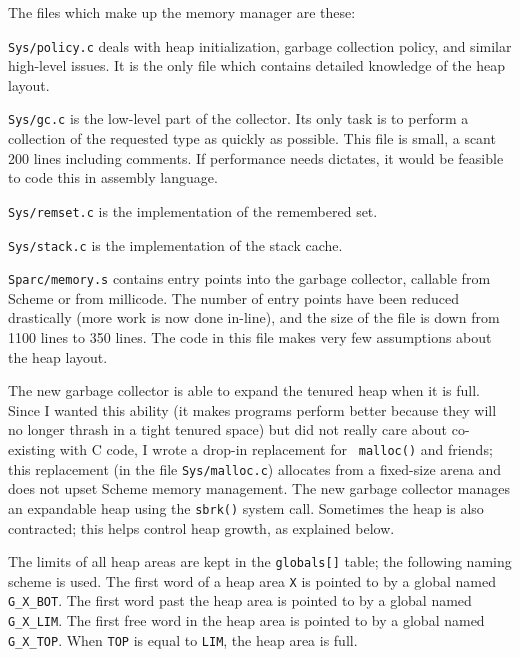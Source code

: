 The files which make up the memory manager are these:

\begin{description}

\item{{\tt Sys/policy.c}} deals with heap initialization, garbage collection 
policy, and similar high-level issues. It is the only file which contains
detailed knowledge of the heap layout.

\item{{\tt Sys/gc.c}} is the low-level part of the collector. Its only task 
is to perform a collection of the requested type as quickly as possible.
This file is small, a scant 200 lines including comments. If performance
needs dictates, it would be feasible to code this in assembly language.

\item{{\tt Sys/remset.c}} is the implementation of the remembered set.

\item{{\tt Sys/stack.c}} is the implementation of the stack cache.

\item{{\tt Sparc/memory.s}} contains entry points into the garbage collector, 
callable from Scheme or from millicode. The number of entry points have been
reduced drastically (more work is now done in-line), and the size of the
file is down from 1100 lines to 350 lines. The code in this file makes 
very few assumptions about the heap layout.

\end{description}

The new garbage collector is able to expand the tenured heap when it is
full. Since I wanted this ability (it makes programs perform better because
they will no longer thrash in a tight tenured space) but did not really care
about co-existing with C code, I wrote a drop-in replacement for {\tt
malloc()} and friends; this replacement (in the file {\tt Sys/malloc.c})
allocates from a fixed-size arena and does not upset Scheme memory
management. The new garbage collector manages an expandable heap using the
{\tt sbrk()} system call. Sometimes the heap is also contracted; this helps
control heap growth, as explained below.

The limits of all heap areas are kept in the {\tt globals[]} table; the
following naming scheme is used. The first word of a heap area {\tt X} is
pointed to by a global named \verb+G_X_BOT+. The first word past the heap
area is pointed to by a global named \verb+G_X_LIM+. The first free word in
the heap area is pointed to by a global named \verb+G_X_TOP+. When {\tt TOP}
is equal to {\tt LIM}, the heap area is full.

